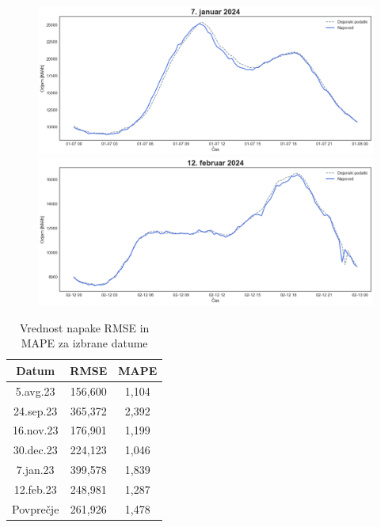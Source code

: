 \documentclass[a4paper, 11pt]{article}
\begin{document}
\begin{figure}[!ht]
    \centering
    \begin{minipage}[c]{0.48\linewidth}
        \includegraphics[width=\linewidth]{napoved_5.png}
    \end{minipage}
    \hfill
    \begin{minipage}[c]{0.48\linewidth}
        \includegraphics[width=\linewidth]{napoved_6.png}
    \end{minipage}
\end{figure}







\begin{table}[!ht]
    \centering
    \caption{Vrednost napake RMSE in MAPE za izbrane datume}\par\medskip
    \label{Tab:RMSE_MAPE}
    \begin{tabular}{c|c|c}
        Datum & RMSE & MAPE \\ \hline
        5.avg.23 & 156,600 & 1,104 \\ 
        24.sep.23 & 365,372 & 2,392 \\ 
        16.nov.23 & 176,901 & 1,199 \\ 
        30.dec.23 & 224,123 & 1,046 \\ 
        7.jan.23 & 399,578 & 1,839 \\ 
        12.feb.23 & 248,981 & 1,287 \\ \hline
        Povprečje & 261,926 & 1,478 \\ 
    \end{tabular}
\end{table}
\end{document}
